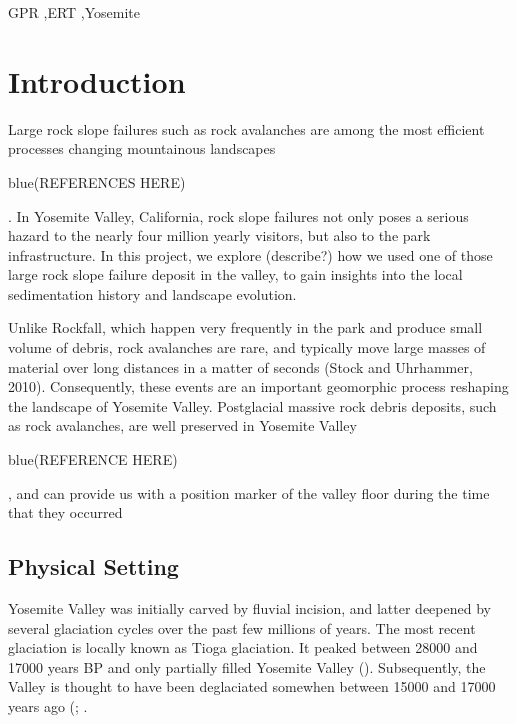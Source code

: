 \documentclass[5p]{elsarticle}
\newcommand{\COMON}{\begin{color}{blue}}
\newcommand{\COMOFF}{\end{color}}
\begin{document}
\begin{frontmatter}
\begin{abstract}
									\end{abstract}

					\begin{keyword}
GPR \sep ERT \sep Yosemite
					\end{keyword}

	\end{frontmatter}







\section{Introduction}

Large rock slope failures such as rock avalanches are among the most efficient processes changing mountainous landscapes \COMON (REFERENCES HERE) \COMOFF. In Yosemite Valley, California, rock slope failures not only poses a serious hazard to the nearly four million yearly visitors, but also to the park infrastructure. In this project, we explore (describe?) how we used one of those large rock slope failure deposit in the valley, to gain insights into the local sedimentation history and landscape evolution. 

Unlike Rockfall, which happen very frequently in the park and produce small volume of debris, rock avalanches are rare, and typically move large masses of material over long distances in a matter of seconds (Stock and Uhrhammer, 2010). Consequently, these events are an important geomorphic process reshaping the landscape of Yosemite Valley. Postglacial massive rock debris deposits, such as rock avalanches,  are well preserved in Yosemite Valley \COMON (REFERENCE HERE) \COMOFF, and can provide us with a position marker of the valley floor during the time that they occurred


\subsection{Physical Setting}

Yosemite Valley was initially carved by fluvial incision, and latter deepened by several glaciation cycles over the past few millions of years. The most recent glaciation is locally known as Tioga glaciation. It peaked between \num{28000} and \num{17000} years BP and only partially filled  Yosemite Valley (\cite{huber1987geologic}). Subsequently, the Valley is thought to have been deglaciated somewhen between \num{15000} and \num{17000} years ago (\cite{huber1987geologic};  \cite{Wieczorek+1996}.
\end{document}
